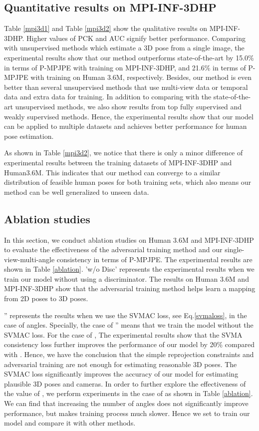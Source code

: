 \documentclass[10pt,twocolumn,letterpaper]{article}
\begin{document}
\subsection{Quantitative results on MPI-INF-3DHP}

Table \ref{mpi3d1} and Table \ref{mpi3d2} show the qualitative results on MPI-INF-3DHP. Higher values of PCK and AUC signify better performance. Comparing with unsupervised methods which estimate a 3D pose from a single image, the experimental results show that our method outperforms state-of-the-art by 15.0\% in terms of P-MPJPE with training on MPI-INF-3DHP, and 21.6\% in terms of P-MPJPE with training on Human 3.6M, respectively. Besides, our method is even better than several unsupervised methods that use multi-view data or temporal data and extra data for training. In addition to comparing with the state-of-the-art unsupervised methods, we also show results from top fully supervised and weakly supervised methods. Hence, the experimental results show that our model can be applied to multiple datasets and achieves better performance for human pose estimation. 

As shown in Table \ref{mpi3d2}, we notice that there is only a minor difference of experimental results between the training datasets of MPI-INF-3DHP and Human3.6M. This indicates that our method can converge to a similar distribution of feasible human poses for both training sets, which also means our method can be well generalized to unseen data.


\subsection{Ablation studies}

In this section, we conduct ablation studies on Human 3.6M and MPI-INF-3DHP to evaluate the effectiveness of the adversarial training method and our single-view-multi-angle consistency in terms of P-MPJPE. The experimental results are shown in Table \ref{ablation}. 'w/o Disc' represents the experimental results when we train our model without using a discriminator. The results on Human 3.6M and MPI-INF-3DHP show that the adversarial training method helps learn a mapping from 2D poses to 3D poses. 

'' represents the results when we use the SVMAC loss, see Eq.\ref{svmaloss}, in the case of  angles.
Specially, the case of '' means that we train the model without the SVMAC loss.
For the case of , The experimental results show that the SVMA consistency loss further improves the performance of our model by 20\% compared with . Hence, we have the conclusion that the simple reprojection constraints and adversarial training are not enough for estimating reasonable 3D poses.
The SVMAC loss significantly improves the accuracy of our model for estimating plausible 3D poses and cameras.
In order to further explore the effectiveness of the value of , we perform experiments in the case of  as shown in Table \ref{ablation}. We can find that increasing the number of angles does not significantly improve performance, but makes training process much slower. Hence we set  to train our model and compare it with other methods.
\end{document}
